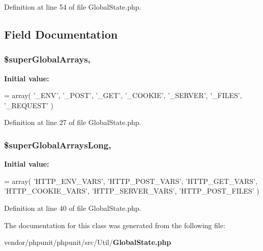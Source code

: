 Definition at line 54 of file Global\+State.\+php.



\subsection{Field Documentation}
\subsubsection[{\$super\+Global\+Arrays}]{\setlength{\rightskip}{0pt plus 5cm}\$super\+Global\+Arrays\hspace{0.3cm}{\ttfamily [static]}, {\ttfamily [protected]}}\label{class_p_h_p_unit___util___global_state_a2472bcf697bff5dbbdd45ecabd4fdf65}
{\bfseries Initial value\+:}
\begin{DoxyCode}
= array(
      \textcolor{stringliteral}{'\_ENV'},
      \textcolor{stringliteral}{'\_POST'},
      \textcolor{stringliteral}{'\_GET'},
      \textcolor{stringliteral}{'\_COOKIE'},
      \textcolor{stringliteral}{'\_SERVER'},
      \textcolor{stringliteral}{'\_FILES'},
      \textcolor{stringliteral}{'\_REQUEST'}
    )
\end{DoxyCode}


Definition at line 27 of file Global\+State.\+php.

\subsubsection[{\$super\+Global\+Arrays\+Long}]{\setlength{\rightskip}{0pt plus 5cm}\$super\+Global\+Arrays\+Long\hspace{0.3cm}{\ttfamily [static]}, {\ttfamily [protected]}}\label{class_p_h_p_unit___util___global_state_a38e2341978642abbcca86d64f6da5c25}
{\bfseries Initial value\+:}
\begin{DoxyCode}
= array(
      \textcolor{stringliteral}{'HTTP\_ENV\_VARS'},
      \textcolor{stringliteral}{'HTTP\_POST\_VARS'},
      \textcolor{stringliteral}{'HTTP\_GET\_VARS'},
      \textcolor{stringliteral}{'HTTP\_COOKIE\_VARS'},
      \textcolor{stringliteral}{'HTTP\_SERVER\_VARS'},
      \textcolor{stringliteral}{'HTTP\_POST\_FILES'}
    )
\end{DoxyCode}


Definition at line 40 of file Global\+State.\+php.



The documentation for this class was generated from the following file\+:\begin{DoxyCompactItemize}
\item 
vendor/phpunit/phpunit/src/\+Util/{\bf Global\+State.\+php}\end{DoxyCompactItemize}
